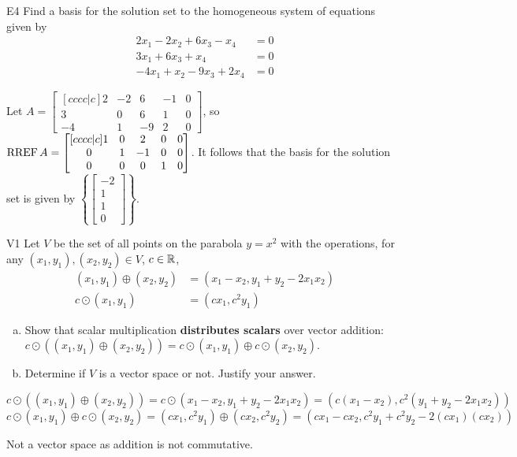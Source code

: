 \documentclass{sbgLAexam}
\begin{document}
\begin{problem}{E4}
Find a basis for the solution set to the homogeneous system of equations
given by
\begin{align*}
2x_1-2x_2+6x_3-x_4 &=0 \\
3x_1+6x_3+x_4 &=0 \\
-4x_1+x_2-9x_3+2x_4&=0
\end{align*}
\end{problem}
\begin{solution}
Let \(A =
  \begin{bmatrix}[cccc|c]
    2 & -2 & 6 & -1 & 0 \\
    3 & 0 & 6 & 1 & 0 \\
    -4 & 1 & -9 & 2 & 0
  \end{bmatrix}
\), so \(\operatorname{RREF} A =
  \begin{bmatrix}[cccc|c]
    1 & 0 & 2 & 0 & 0 \\
    0 & 1 & -1 & 0 & 0 \\
    0 & 0 & 0 & 1 & 0
  \end{bmatrix}
\).
It follows that the basis for the solution set is given by \(\left\{
  \begin{bmatrix}
    -2 \\
    1 \\
    1 \\
    0
  \end{bmatrix}
\right\}\).
\end{solution}
\begin{extract}\newpage\end{extract}
\begin{problem}{V1}
Let $V$ be the set of all points on the parabola $y=x^2$ with the operations, for any $(x_1,y_1), (x_2,y_2) \in V$, $c \in \mathbb{R}$,
\begin{align*}
(x_1,y_1) \oplus (x_2,y_2) &= (x_1-x_2,y_1+y_2-2x_1x_2) \\
c \odot (x_1,y_1) &= (cx_1, c^2y_1)
\end{align*}
\begin{enumerate}[(a)]
\item Show that scalar multiplication \textbf{distributes scalars} over
      vector addition:
      \(c\odot((x_1,y_1) \oplus (x_2,y_2))=
      c\odot(x_1,y_1) \oplus c\odot(x_2,y_2)\).
\item Determine if $V$ is a vector space or not.  Justify your answer.
\end{enumerate}
\end{problem}
\begin{solution}
$$ c\odot((x_1,y_1) \oplus (x_2,y_2))= c \odot (x_1-x_2,y_1+y_2-2x_1x_2) = (c(x_1-x_2), c^2(y_1+y_2-2x_1x_2) ) $$
$$ c\odot(x_1,y_1) \oplus c\odot(x_2,y_2) = (cx_1,c^2y_1) \oplus (cx_2,c^2y_2) = (cx_1-cx_2, c^2y_1+c^2y_2-2(cx_1)(cx_2) )$$

Not a vector space as addition is not commutative.
\end{solution}
\end{document}
